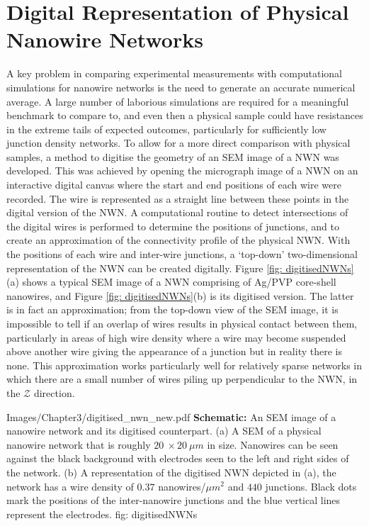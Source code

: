 \section{Digital Representation of Physical Nanowire Networks}
\label{sec:image_proc}

A key problem in comparing experimental measurements with computational simulations for nanowire networks is the need to generate an accurate numerical average. A large number of laborious simulations are required for a meaningful benchmark to compare to, and even then a physical sample could have resistances in the extreme tails of expected outcomes, particularly for sufficiently low junction density networks. To allow for a more direct comparison with physical samples, a method to digitise the geometry of an SEM image of a NWN was developed. This was achieved by opening the micrograph image of a NWN on an interactive digital canvas where the start and end positions of each wire were recorded. The wire is represented as a straight line between these points in the digital version of the NWN. A computational routine to detect intersections of the digital wires is performed to determine the positions of junctions, and to create an approximation of the connectivity profile of the physical NWN. With the positions of each wire and inter-wire junctions, a `top-down' two-dimensional representation of the NWN can be created digitally. Figure \ref{fig: digitisedNWNs}(a) shows a typical SEM image of a NWN comprising of Ag/PVP core-shell nanowires, and Figure \ref{fig: digitisedNWNs}(b) is its digitised version. The latter is in fact an approximation; from the top-down view of the SEM image, it is impossible to tell if an overlap of wires results in physical contact between them, particularly in areas of high wire density where a wire may become suspended above another wire giving the appearance of a junction but in reality there is none. This approximation works particularly well for relatively sparse networks in which there are a small number of wires piling up perpendicular to the NWN, in the $\mathcal{Z}$ direction.

{Images/Chapter3/digitised_nwn_new.pdf}
{\textbf{Schematic:} An SEM image of a nanowire network and its digitised counterpart.}
{(a) A SEM of a physical nanowire network that is roughly $20 ~ \times 20 ~ \mu m$ in size. Nanowires can be seen against the black background with electrodes seen to the left and right sides of the network. (b) A representation of the digitised NWN depicted in (a), the network has a wire density of $0.37$ nanowires/$\mu m^2$ and $440$ junctions. Black dots mark the positions of the inter-nanowire junctions and the blue vertical lines represent the electrodes\cite{rocha2015}.}
{fig: digitisedNWNs}

